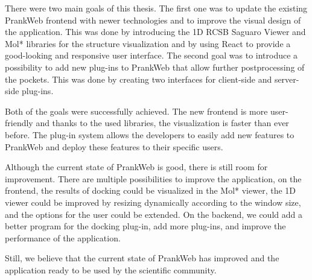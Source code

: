 
\label{chap:conclusion}

There were two main goals of this thesis. The first one was to update the existing PrankWeb frontend with newer technologies and to improve the visual design of the application. This was done by introducing the 1D RCSB Saguaro Viewer and Mol* libraries for the structure visualization and by using React to provide a good-looking and responsive user interface. The second goal was to introduce a possibility to add new plug-ins to PrankWeb that allow further postprocessing of the pockets. This was done by creating two interfaces for client-side and server-side plug-ins.

Both of the goals were successfully achieved. The new frontend is more user-friendly and thanks to the used libraries, the visualization is faster than ever before. The plug-in system allows the developers to easily add new features to PrankWeb and deploy these features to their specific users.

Although the current state of PrankWeb is good, there is still room for improvement. There are multiple possibilities to improve the application, on the frontend, the results of docking could be visualized in the Mol* viewer, the 1D viewer could be improved by resizing dynamically according to the window size, and the options for the user could be extended. On the backend, we could add a better program for the docking plug-in, add more plug-ins, and improve the performance of the application.

Still, we believe that the current state of PrankWeb has improved and the application ready to be used by the scientific community.


